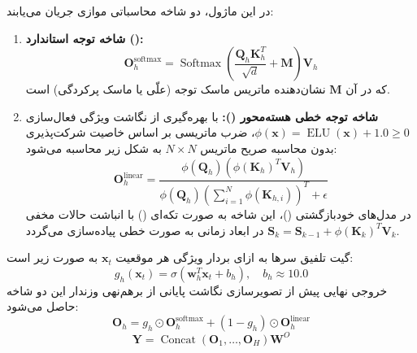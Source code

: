 در این ماژول، دو شاخه محاسباتی موازی جریان می‌یابند:
\begin{enumerate}
    \item \textbf{شاخه توجه استاندارد ():}
    \begin{equation}
    \mathbf{O}_h^{\text{softmax}} = \operatorname{Softmax}\left(\frac{\mathbf{Q}_h \mathbf{K}_h^T}{\sqrt{d}} + \mathbf{M}\right) \mathbf{V}_h
    \end{equation}
    که در آن $\mathbf{M}$ نشان‌دهنده ماتریس ماسک توجه (علّی یا ماسک پرکردگی) است.
    
    \item \textbf{شاخه توجه خطی هسته‌محور ():}
    با بهره‌گیری از نگاشت ویژگی فعال‌سازی $\phi(\mathbf{x}) = \operatorname{ELU}(\mathbf{x}) + 1.0 \ge 0$، ضرب ماتریسی بر اساس خاصیت شرکت‌پذیری بدون محاسبه صریح ماتریس $N \times N$ به شکل زیر محاسبه می‌شود:
    \begin{equation}
    \mathbf{O}_h^{\text{linear}} = \frac{\phi(\mathbf{Q}_h) \left( \phi(\mathbf{K}_h)^T \mathbf{V}_h \right)}{\phi(\mathbf{Q}_h) \left( \sum_{i=1}^N \phi(\mathbf{K}_{h, i}) \right)^T + \epsilon}
    \end{equation}
    در مدل‌های خودبازگشتی ()، این شاخه به صورت تکه‌ای () با انباشت حالات مخفی $\mathbf{S}_k = \mathbf{S}_{k-1} + \phi(\mathbf{K}_k)^T \mathbf{V}_k$ در ابعاد زمانی به صورت خطی پیاده‌سازی می‌گردد.
\end{enumerate}

گیت تلفیق سرها به ازای بردار ویژگی هر موقعیت $\mathbf{x}_t$ به صورت زیر است:
\begin{equation}
g_h(\mathbf{x}_t) = \sigma\left(\mathbf{w}_h^T \mathbf{x}_t + b_h\right), \quad b_h \approx 10.0
\end{equation}
خروجی نهایی پیش از تصویرسازی نگاشت پایانی از برهم‌نهی وزندار این دو شاخه حاصل می‌شود:
\begin{equation}
\mathbf{O}_h = g_h \odot \mathbf{O}_h^{\text{softmax}} + (1 - g_h) \odot \mathbf{O}_h^{\text{linear}}
\end{equation}
\begin{equation}
\mathbf{Y} = \operatorname{Concat}(\mathbf{O}_1, \dots, \mathbf{O}_H) \mathbf{W}^O
\end{equation}

